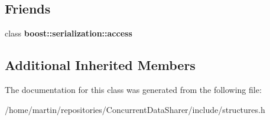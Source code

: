 \subsection*{Friends}
\begin{DoxyCompactItemize}
\item 
class {\bfseries boost\+::serialization\+::access}\hypertarget{classQueueElementTCPSend_ac98d07dd8f7b70e16ccb9a01abf56b9c}{}\label{classQueueElementTCPSend_ac98d07dd8f7b70e16ccb9a01abf56b9c}

\end{DoxyCompactItemize}
\subsection*{Additional Inherited Members}


The documentation for this class was generated from the following file\+:\begin{DoxyCompactItemize}
\item 
/home/martin/repositories/\+Concurrent\+Data\+Sharer/include/structures.\+h\end{DoxyCompactItemize}
